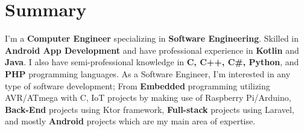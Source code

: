 

\textcolor{darkgray}{\noindent\makebox[\linewidth]{\rule{\maxdimen}{2pt}}}

\section*{\LARGE{Summary}}
I'm a \textbf{Computer Engineer} specializing in \textbf{Software Engineering}.
Skilled in \textbf{Android App Development} and have professional experience in \textbf{Kotlin} and \textbf{Java}.
I also have semi-professional knowledge in \textbf{C, C++, C\#, Python}, and \textbf{PHP} programming languages.
As a Software Engineer, I'm interested in any type of software development;
From \textbf{Embedded} programming utilizing AVR/ATmega with C, \textbf{}IoT projects by making use of Raspberry Pi/Arduino,
\textbf{Back-End} projects using Ktor framework, \textbf{Full-stack} projects using Laravel, and mostly \textbf{Android} projects which are my main area of expertise.\\
\textcolor{darkgray}{\noindent\makebox[\linewidth]{\rule{\maxdimen}{2pt}}}

\begin{multicols}{2}
    

    
\end{multicols}
\textcolor{darkgray}{\noindent\makebox[\linewidth]{\rule{\maxdimen}{2pt}}}

